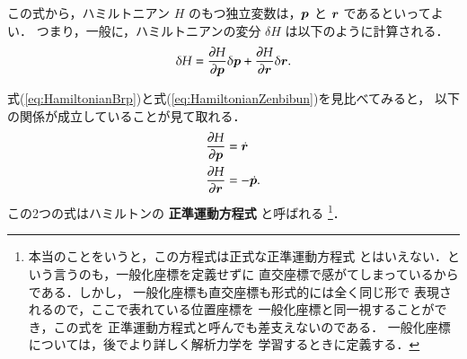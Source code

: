                 この式から，ハミルトニアン $H$ のもつ独立変数は，$\boldsymbol{p}$ と $\boldsymbol{r}$ であるといってよい．
                つまり，一般に，ハミルトニアンの変分 $\delta H$ は以下のように計算される．
                    \begin{align}\label{eq:HamiltonianZenbibun}
                        \delta H = \frac{\rd H}{\rd \bp}\delta \bp + \frac{\rd H}{\rd \br}\delta \br.
                    \end{align}

                式(\ref{eq:HamiltonianBrp})と式(\ref{eq:HamiltonianZenbibun})を見比べてみると，
                以下の関係が成立していることが見て取れる．
                    \begin{align}
                        \frac{\partial H}{\partial \boldsymbol{p}} &= \dot{\boldsymbol{r}} \\
                        \frac{\partial H}{\partial \boldsymbol{r}} &= - \dot{\boldsymbol{p}}.
                    \end{align}
                この2つの式はハミルトンの \textbf{正準運動方程式} と呼ばれる
                    \footnote{
                        本当のことをいうと，この方程式は正式な正準運動方程式
                        とはいえない．という言うのも，一般化座標を定義せずに
                        直交座標で感がてしまっているからである．しかし，
                        一般化座標も直交座標も形式的には全く同じ形で
                        表現されるので，ここで表れている位置座標を
                        一般化座標と同一視することができ，この式を
                        正準運動方程式と呼んでも差支えないのである．
                        一般化座標については，後でより詳しく解析力学を
                        学習するときに定義する．
                    }．

